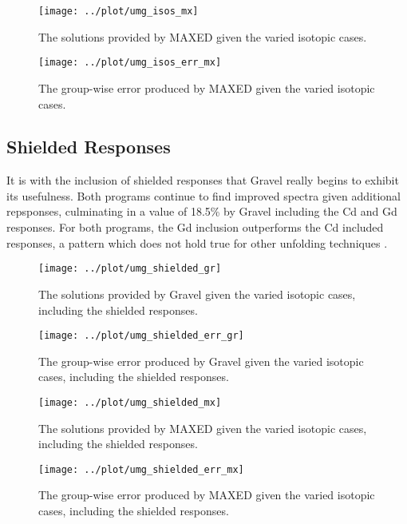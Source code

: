 \documentclass[journal]{IEEEtran}
\begin{document}
\begin{figure}[h!tb]
  \centering
  \texttt{[image: ../plot/umg\_isos\_mx]}
  \caption{The solutions provided by MAXED given the varied  isotopic cases.}
  \label{fig:isos_mx}
\end{figure}

\begin{figure}[h!tb]
  \centering
  \texttt{[image: ../plot/umg\_isos\_err\_mx]}
  \caption{The group-wise error produced by MAXED given the varied  isotopic cases.}
  \label{fig:isos_err_mx}
\end{figure}

\subsection{Shielded Responses}

It is with the inclusion of shielded responses that Gravel really begins to exhibit its usefulness.
Both programs continue to find improved spectra given additional repsponses, culminating in a value of 18.5\% by Gravel including the Cd and Gd responses.
For both programs, the Gd inclusion outperforms the Cd included responses, a pattern which does not hold true for other unfolding techniques \cite{roberts2018use}.

\begin{figure}[h!tb]
  \centering
  \texttt{[image: ../plot/umg\_shielded\_gr]}
  \caption{The solutions provided by Gravel given the varied isotopic cases, including the shielded responses.}
  \label{fig:shielded_gr}
\end{figure}

\begin{figure}[h!tb]
  \centering
  \texttt{[image: ../plot/umg\_shielded\_err\_gr]}
  \caption{The group-wise error produced by Gravel given the varied isotopic cases, including the shielded responses.}
  \label{fig:shielded_err_gr}
\end{figure}

\begin{figure}[h!tb]
  \centering
  \texttt{[image: ../plot/umg\_shielded\_mx]}
  \caption{The solutions provided by MAXED given the varied isotopic cases, including the shielded responses.}
  \label{fig:shielded_mx}
\end{figure}

\begin{figure}[h!tb]
  \centering
  \texttt{[image: ../plot/umg\_shielded\_err\_mx]}
  \caption{The group-wise error produced by MAXED given the varied isotopic cases, including the shielded responses.}
  \label{fig:shielded_err_mx}
\end{figure}
\end{document}
